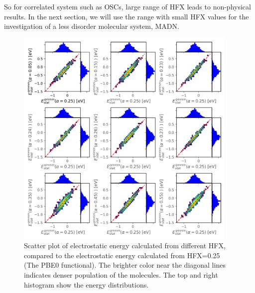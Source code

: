 \documentclass[letterpaper,12pt]{article}
\begin{document}
So for correlated system such as OSCs, large range of HFX leads to non-physical results. 
In the next section, we will use the range with small HFX values for the investigation of a less disorder molecular system, MADN. 

\begin{figure}[h]
    \centering
    \includegraphics[width=0.95\textwidth]{figs/BCP_HFX/scatterEstat_qmmm.png}
    \caption{Scatter plot of electrostatic energy calculated from different HFX, compared to the electrostatic energy calculated from HFX=0.25 (The PBE0 functional). The brighter color near the diagonal lines indicates denser population of the molecules.  The top and right histogram show the energy distributions.}
    \label{fig:Estat_qmmm_BCP}
\end{figure}
\end{document}
